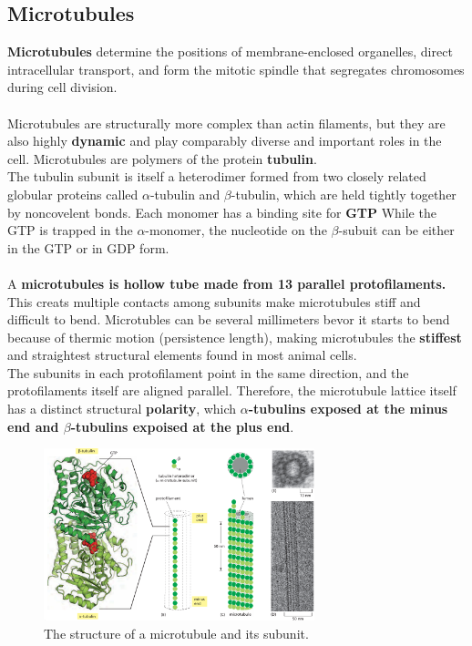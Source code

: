 \documentclass[../main.tex]{subfiles}
\begin{document}
\subsection{Microtubules}
\textbf{Microtubules} determine the positions of membrane-enclosed organelles, direct intracellular transport, and form the mitotic spindle that segregates chromosomes during cell division.\\
\\
Microtubules are structurally more complex than actin filaments, but they are also highly \textbf{dynamic} and play comparably diverse and important roles in the cell. Microtubules are polymers of the protein \textbf{\gls{tubulin}}.  \\
\indent The tubulin subunit is itself a heterodimer formed from two closely related globular proteins called $\alpha$-tubulin and $\beta$-tubulin, which are held tightly together by noncovelent bonds.  Each monomer has a binding site for \textbf{GTP} While the GTP is trapped in the $\alpha$-monomer, the nucleotide on the $\beta$-subuit can be either in the GTP or in GDP form. \\
\\
A \textbf{\gls{microtubules} is hollow tube made from 13 parallel protofilaments.} This creats multiple contacts among subunits make microtubules stiff and difficult to bend. Microtubles can be several millimeters bevor it starts to bend because of thermic motion (persistence length), making microtubules the \textbf{stiffest} and straightest structural elements found in most animal cells. \\
\indent The subunits in each protofilament point in the same direction, and the protofilaments itself are aligned parallel. Therefore, the microtubule lattice itself has a distinct structural \textbf{polarity}, which \textbf{$\alpha$-tubulins exposed at the minus end and $\beta$-tubulins expoised at the plus end}. 
\begin{figure}[H]
	\centering
	\includegraphics[width = 0.7\textwidth]{21}
	\caption{The structure of a microtubule and its subunit.}
\end{figure}
\end{document}
